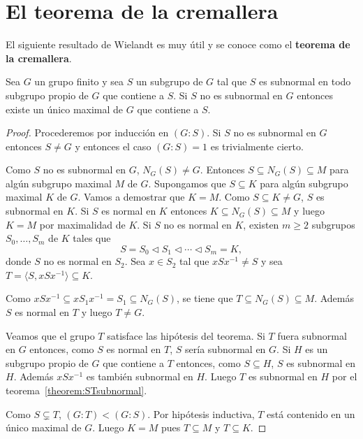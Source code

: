 \chapter{El teorema de la cremallera}

El siguiente resultado de Wielandt es muy útil y se conoce como el
\textbf{teorema de la cremallera}. 

\begin{theorem}[Wielandt]
	\label{theorem:zipper}
	Sea $G$ un grupo finito y sea $S$ un subgrupo de $G$ tal que $S$ es
	subnormal en todo subgrupo propio de $G$ que contiene a $S$. Si $S$ no es
	subnormal en $G$ entonces existe un único maximal de $G$ que contiene a
	$S$.
\end{theorem}

\begin{proof}
	Procederemos por inducción en $(G:S)$. Si $S$ no es subnormal en $G$
	entonces $S\ne G$ y entonces el caso $(G:S)=1$ es trivialmente cierto. 

	Como $S$ no es subnormal en $G$, $N_G(S)\ne G$. Entonces $S\subseteq
	N_G(S)\subseteq M$ para algún subgrupo maximal $M$ de $G$. Supongamos que
	$S\subseteq K$ para algún subgrupo maximal $K$ de $G$. Vamos a demostrar
	que $K=M$. Como $S\subseteq K\ne G$, $S$ es subnormal en $K$. Si $S$ es
	normal en $K$ entonces $K\subseteq N_G(S)\subseteq M$ y luego $K=M$ por
	maximalidad de $K$. Si $S$ no es normal en $K$, existen $m\geq2$ 
	subgrupos $S_0,\dots,S_m$ de $K$ tales que 
	\[
		S=S_0\triangleleft S_1\triangleleft\cdots\triangleleft S_m=K,
	\]
	donde $S$ no es normal en $S_2$.  Sea $x\in S_2$ tal que $xSx^{-1}\ne S$ y
	sea $T=\langle S,xSx^{-1}\rangle\subseteq K$. 

	Como $xSx^{-1}\subseteq xS_1x^{-1}=S_1\subseteq N_G(S)$, se tiene que
	$T\subseteq N_G(S)\subseteq M$. Además $S$ es normal en $T$ y luego $T\ne
	G$. 

	Veamos que el grupo $T$ satisface las hipótesis del teorema. Si $T$ fuera
	subnormal en $G$ entonces, como $S$ es normal en $T$, $S$ sería subnormal
	en $G$. Si $H$ es un subgrupo propio de $G$ que contiene a $T$ entonces,
	como $S\subseteq H$, $S$ es subnormal en $H$. Además $xSx^{-1}$ es también
	subnormal en $H$.  Luego $T$ es subnormal en $H$ por el
	teorema~\ref{theorem:STsubnormal}.

	Como $S\subsetneq T$, $(G:T)<(G:S)$. Por hipótesis inductiva, $T$ está
	contenido en un único maximal de $G$. Luego $K=M$ pues $T\subseteq M$ y
	$T\subseteq K$.
\end{proof}

